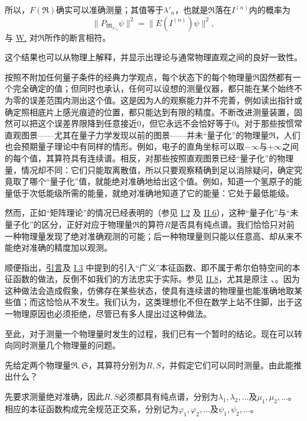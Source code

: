 \documentclass[fontsize=13pt,twoside,openany,headings=normal,parskip=false,bookmarkpackage=false,DIV=calc]{scrbook}
\begin{document}
所以，$F(\mathfrak R)$确实可以准确测量；其值等于$\lambda'_n$，也就是$\mathfrak R$落在$I^{(n)}$内的概率为
\[
\|P_{\mathfrak M_{\lambda'_n}}\psi\|^2=\|E(I^{(n)})\psi\|^2,
\]
与 \hyperref[post:III.1.W]{W.} 对$\mathfrak R$所作的断言相符。

这个结果也可以从物理上解释，并显示出理论与通常物理直观之间的良好一致性。

按照不附加任何量子条件的经典力学观点，每个状态下的每个物理量$\mathfrak R$固然都有一个完全确定的值；但同时也承认，任何可以设想的测量仪器，都只能在某个始终不为零的误差范围内测出这个值。这是因为人的观察能力并不完善，例如读出指针或确定照相底片上感光痕迹的位置，都只能达到有限的精度。不断改进测量装置，固然可以把这个误差界限降到任意接近$0$，但它永远不会恰好等于$0$。对于那些按惯常直观图景——尤其在量子力学发现以前的图景——并未“量子化”的物理量$\mathfrak R$，人们也会预期量子理论中有同样的情形。例如，电子的直角坐标可以取$-\infty$与$+\infty$之间的每个值，其算符具有连续谱。相反，对那些按照直观图景已经“量子化”的物理量，情况却不同：它们只能取离散值，所以只要观察精确到足以消除疑问，确定究竟取了哪个“量子化”值，就能绝对准确地给出这个值。例如，知道一个氢原子的能量低于次低能级所需的能量，就绝对准确地知道了它的能量：它处于最低能级。

\hypertarget{origpage-117}{}\label{origpage-117}然而，正如“矩阵理论”的情况已经表明的（参见 \hyperref[sec:I.2]{I.2} 及 \hyperref[sec:II.6]{II.6}），这种“量子化”与“未量子化”的区分，正好对应于物理量$\mathfrak R$的算符$R$是否具有纯点谱。我们恰恰只对前一种物理量发现了绝对准确观测的可能；后一种物理量则只能以任意高、却从来不能绝对准确的精度加以观测。

顺便指出，\CJKglue \hyperref[chap:introduction]{引言}\CJKglue 及 \hyperref[sec:I.3]{I.3} 中提到的引入“广义”本征函数、即不属于希尔伯特空间的本征函数的做法，反倒不如我们的方法忠实于实际。参见 \hyperref[sec:II.8]{II.8}，尤其是原注 \hyperlink{note-84}{}、\hyperlink{note-86}{}。因为这种做法会造成假象，仿佛存在某些状态，使具有连续谱的物理量也能准确地取某些值；而这恰恰从不发生。我们认为，这类理想化不但在数学上站不住脚，出于这一物理原因也必须拒绝，尽管已有多人提出过这种做法。

至此，对于测量一个物理量时发生的过程，我们已有一个暂时的结论。现在可以转向同时测量几个物理量的问题。

先给定两个物理量$\mathfrak R,\allowbreak \mathfrak S$，其算符分别为$R,\allowbreak S$，并假定它们可以同时测量。由此能推出什么？

先要求测量绝对准确，因此$R,\allowbreak S$必须都具有纯点谱，分别为$\lambda_1,\allowbreak \lambda_2,\allowbreak \ldots$及$\mu_1,\allowbreak \mu_2,\allowbreak \ldots$。相应的本征函数构成完全规范正交系，分别记为$\varphi_1,\allowbreak \varphi_2,\allowbreak \ldots$及$\psi_1,\allowbreak \psi_2,\allowbreak \ldots$。
\end{document}
